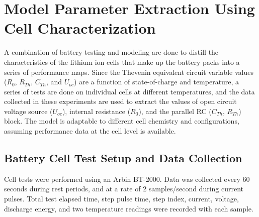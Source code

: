 \documentclass[]{aiaa-tc}%
\begin{document}
\section{Model Parameter Extraction Using Cell Characterization}

A combination of battery testing and modeling are done to distill the characteristics of the lithium ion cells that make up the battery packs into a series of performance maps. Since the Thevenin equivalent circuit variable values ($R_{0}$, $R_{Th}$, $C_{Th}$, and $U_{oc}$) are a function of state-of-charge and temperature, a series of tests are done on individual cells at different temperatures, and the data collected in these experiments are used to extract the values of open circuit voltage source ($U_{oc}$), internal resistance ($R_{0}$), and the parallel RC ($C_{Th}$, $R_{Th}$) block. The model is adaptable to different cell chemistry and configurations, assuming performance data at the cell level is available.



\subsection{Battery Cell Test Setup and Data Collection}

Cell tests were performed using an Arbin BT-2000. Data was collected every 60 seconds during rest periods, and at a rate of 2 samples/second during current pulses. Total test elapsed time, step pulse time, step index, current, voltage, discharge energy, and two temperature readings were recorded with each sample. 
\end{document}
